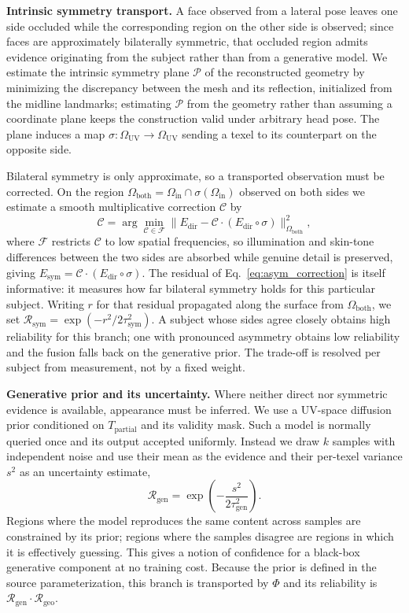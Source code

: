 \documentclass[runningheads]{llncs}
\newcommand{\OUV}{\Omega_{\text{UV}}}
\newcommand{\Oin}{\Omega_{\text{in}}}
\newcommand{\Tpartial}{T_{\text{partial}}}
\newcommand{\Rel}{\mathcal{R}}
\begin{document}
\textbf{Intrinsic symmetry transport.} A face observed from a lateral pose
leaves one side occluded while the corresponding region on the other side is
observed; since faces are approximately bilaterally symmetric, that occluded
region admits evidence originating from the subject rather than from a
generative model. We estimate the intrinsic symmetry plane $\mathcal{P}$ of the
reconstructed geometry by minimizing the discrepancy between the mesh and its
reflection, initialized from the midline landmarks; estimating $\mathcal{P}$
from the geometry rather than assuming a coordinate plane keeps the
construction valid under arbitrary head pose. The plane induces a map
$\sigma\colon \OUV \to \OUV$ sending a texel to its counterpart on the opposite
side.

Bilateral symmetry is only approximate, so a transported observation must be
corrected. On the region $\Omega_{\text{both}} = \Oin \cap \sigma(\Oin)$
observed on both sides we estimate a smooth multiplicative correction
$\mathcal{C}$ by
\begin{equation}
  \mathcal{C} = \arg\min_{\mathcal{C} \in \mathcal{F}}
    \bigl\| E_{\text{dir}} - \mathcal{C}\cdot(E_{\text{dir}} \circ \sigma)
    \bigr\|^2_{\Omega_{\text{both}}},
  \label{eq:asym_correction}
\end{equation}
where $\mathcal{F}$ restricts $\mathcal{C}$ to low spatial frequencies, so
illumination and skin-tone differences between the two sides are absorbed while
genuine detail is preserved, giving
$E_{\text{sym}} = \mathcal{C}\cdot (E_{\text{dir}} \circ \sigma)$. The residual
of Eq.~\eqref{eq:asym_correction} is itself informative: it measures how far
bilateral symmetry holds for this particular subject. Writing $r$ for that
residual propagated along the surface from $\Omega_{\text{both}}$, we set
$\Rel_{\text{sym}} = \exp(-r^2/2\tau_{\text{sym}}^2)$. A subject whose sides
agree closely obtains high reliability for this branch; one with pronounced
asymmetry obtains low reliability and the fusion falls back on the generative
prior. The trade-off is resolved per subject from measurement, not by a fixed
weight.

\textbf{Generative prior and its uncertainty.} Where neither direct nor
symmetric evidence is available, appearance must be inferred. We use a UV-space
diffusion prior \cite{li2024uvidm} conditioned on $\Tpartial$ and its validity
mask. Such a model is normally queried once and its output accepted uniformly.
Instead we draw $k$ samples with independent noise and use their mean as the
evidence and their per-texel variance $s^2$ as an uncertainty estimate,
\begin{equation}
  \Rel_{\text{gen}} = \exp\!\left(-\frac{s^2}{2\tau_{\text{gen}}^2}\right).
  \label{eq:r_gen}
\end{equation}
Regions where the model reproduces the same content across samples are
constrained by its prior; regions where the samples disagree are regions in
which it is effectively guessing. This gives a notion of confidence for a
black-box generative component at no training cost. Because the prior is
defined in the source parameterization, this branch is transported by $\Phi$
and its reliability is $\Rel_{\text{gen}}\cdot\Rel_{\text{geo}}$.
\end{document}
